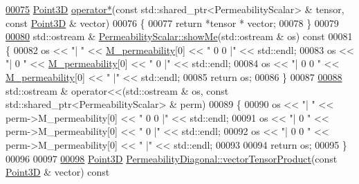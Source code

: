 \begin{DoxyCode}
\hypertarget{Permeability_8cpp_source.tex_l00075}{}\hyperlink{namespaceFVCode3D_a6e6874314b749e7b94c1e0f7b2e25ddc}{00075} \hyperlink{classFVCode3D_1_1Point3D}{Point3D} \hyperlink{classFVCode3D_1_1PermeabilityBase_a04284b595d50559389f6098e76611b76}{operator*}(\textcolor{keyword}{const} std::shared\_ptr<PermeabilityScalar> & tensor, \textcolor{keyword}{const} 
      \hyperlink{classFVCode3D_1_1Point3D}{Point3D} & vector)
00076 \{
00077     \textcolor{keywordflow}{return} *tensor * vector;
00078 \}
00079 
\hypertarget{Permeability_8cpp_source.tex_l00080}{}\hyperlink{classFVCode3D_1_1PermeabilityScalar_a9cb41282bbadb37a93a6a45a7120c04e}{00080} std::ostream & \hyperlink{classFVCode3D_1_1PermeabilityScalar_a9cb41282bbadb37a93a6a45a7120c04e}{PermeabilityScalar::showMe}(std::ostream & os)\textcolor{keyword}{ const}
00081 \textcolor{keyword}{}\{
00082     os << \textcolor{stringliteral}{"| "} << \hyperlink{classFVCode3D_1_1PermeabilityBase_aef595aa25abfeaf51e8d242e5de2055d}{M\_permeability}[0] << \textcolor{stringliteral}{" 0 0 |"} << std::endl;
00083     os << \textcolor{stringliteral}{"| 0 "} << \hyperlink{classFVCode3D_1_1PermeabilityBase_aef595aa25abfeaf51e8d242e5de2055d}{M\_permeability}[0] << \textcolor{stringliteral}{" 0 |"} << std::endl;
00084     os << \textcolor{stringliteral}{"| 0 0 "} << \hyperlink{classFVCode3D_1_1PermeabilityBase_aef595aa25abfeaf51e8d242e5de2055d}{M\_permeability}[0] << \textcolor{stringliteral}{" |"} << std::endl;
00085     \textcolor{keywordflow}{return} os;
00086 \}
00087 
\hypertarget{Permeability_8cpp_source.tex_l00088}{}\hyperlink{namespaceFVCode3D_afcbf0ace1266ac69b82a7154d94459a1}{00088} std::ostream & operator<<(std::ostream & os, const std::shared\_ptr<PermeabilityScalar> & perm)
00089 \{
00090     os << \textcolor{stringliteral}{"| "} << perm->M\_permeability[0] << \textcolor{stringliteral}{" 0 0 |"} << std::endl;
00091     os << \textcolor{stringliteral}{"| 0 "} << perm->M\_permeability[0] << \textcolor{stringliteral}{" 0 |"} << std::endl;
00092     os << \textcolor{stringliteral}{"| 0 0 "} << perm->M\_permeability[0] << \textcolor{stringliteral}{" |"} << std::endl;
00093 
00094     \textcolor{keywordflow}{return} os;
00095 \}
00096 
00097 
\hypertarget{Permeability_8cpp_source.tex_l00098}{}\hyperlink{classFVCode3D_1_1PermeabilityDiagonal_a281067ac8a3ea3058ae886f036eadb01}{00098} \hyperlink{classFVCode3D_1_1Point3D}{Point3D} \hyperlink{classFVCode3D_1_1PermeabilityDiagonal_a281067ac8a3ea3058ae886f036eadb01}{PermeabilityDiagonal::vectorTensorProduct}(\textcolor{keyword}{const} 
      \hyperlink{classFVCode3D_1_1Point3D}{Point3D} & vector)\textcolor{keyword}{ const}

\end{DoxyCode}
